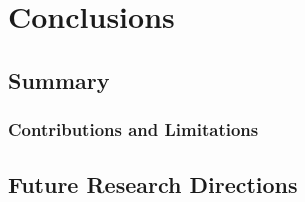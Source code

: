 \chapter{Conclusions}
\label{Conc}


\section{Summary}\label{Conc:sum}

\subsection{Contributions and Limitations}

\section{Future Research Directions}\label{Conc:future}
